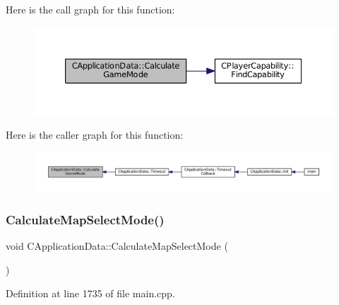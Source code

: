 Here is the call graph for this function\+:
\nopagebreak
\begin{figure}[H]
\begin{center}
\leavevmode
\includegraphics[width=350pt]{classCApplicationData_a782d7204356ef9560deedd54320d4f16_cgraph}
\end{center}
\end{figure}
Here is the caller graph for this function\+:
\nopagebreak
\begin{figure}[H]
\begin{center}
\leavevmode
\includegraphics[width=350pt]{classCApplicationData_a782d7204356ef9560deedd54320d4f16_icgraph}
\end{center}
\end{figure}
\hypertarget{classCApplicationData_a3c481d6483d165488596144a4bcf95cf}{}\label{classCApplicationData_a3c481d6483d165488596144a4bcf95cf} 
\subsubsection{\texorpdfstring{Calculate\+Map\+Select\+Mode()}{CalculateMapSelectMode()}}
{\footnotesize\ttfamily void C\+Application\+Data\+::\+Calculate\+Map\+Select\+Mode (\begin{DoxyParamCaption}{ }\end{DoxyParamCaption})\hspace{0.3cm}{\ttfamily [protected]}}



Definition at line 1735 of file main.\+cpp.


